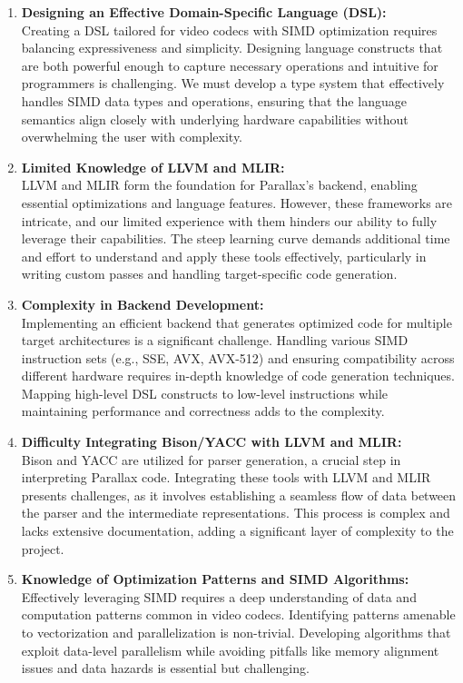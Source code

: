 \documentclass[12pt,a4paper]{article}
\begin{document}
\begin{enumerate}
    \item \textbf{Designing an Effective Domain-Specific Language (DSL):} \\
    Creating a DSL tailored for video codecs with SIMD optimization requires balancing expressiveness and simplicity. Designing language constructs that are both powerful enough to capture necessary operations and intuitive for programmers is challenging. We must develop a type system that effectively handles SIMD data types and operations, ensuring that the language semantics align closely with underlying hardware capabilities without overwhelming the user with complexity.

    \item \textbf{Limited Knowledge of LLVM and MLIR:} \\
    LLVM and MLIR form the foundation for Parallax's backend, enabling essential optimizations and language features. However, these frameworks are intricate, and our limited experience with them hinders our ability to fully leverage their capabilities. The steep learning curve demands additional time and effort to understand and apply these tools effectively, particularly in writing custom passes and handling target-specific code generation.

    \item \textbf{Complexity in Backend Development:} \\
    Implementing an efficient backend that generates optimized code for multiple target architectures is a significant challenge. Handling various SIMD instruction sets (e.g., SSE, AVX, AVX-512) and ensuring compatibility across different hardware requires in-depth knowledge of code generation techniques. Mapping high-level DSL constructs to low-level instructions while maintaining performance and correctness adds to the complexity.

    \item \textbf{Difficulty Integrating Bison/YACC with LLVM and MLIR:} \\
    Bison and YACC are utilized for parser generation, a crucial step in interpreting Parallax code. Integrating these tools with LLVM and MLIR presents challenges, as it involves establishing a seamless flow of data between the parser and the intermediate representations. This process is complex and lacks extensive documentation, adding a significant layer of complexity to the project.

    \item \textbf{Knowledge of Optimization Patterns and SIMD Algorithms:} \\
    Effectively leveraging SIMD requires a deep understanding of data and computation patterns common in video codecs. Identifying patterns amenable to vectorization and parallelization is non-trivial. Developing algorithms that exploit data-level parallelism while avoiding pitfalls like memory alignment issues and data hazards is essential but challenging.


\end{enumerate}
\end{document}
